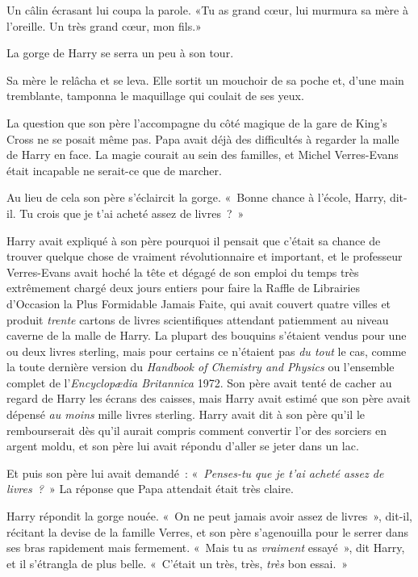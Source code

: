 Un câlin écrasant lui coupa la parole. «Tu as grand cœur, lui murmura sa mère à l'oreille. Un très grand cœur, mon fils.»

La gorge de Harry se serra un peu à son tour.

Sa mère le relâcha et se leva. Elle sortit un mouchoir de sa poche et, d'une main tremblante, tamponna le maquillage qui coulait de ses yeux.

La question que son père l'accompagne du côté magique de la gare de King's Cross ne se posait même pas.
Papa avait déjà des difficultés à regarder la malle de Harry en face.
La magie courait au sein des familles, et Michel Verres-Evans était incapable ne serait-ce que de marcher.

Au lieu de cela son père s'éclaircit la gorge.
«~Bonne chance à l'école, Harry, dit-il. Tu crois que je t'ai acheté assez de livres~?~»

Harry avait expliqué à son père pourquoi il pensait que c'était sa chance de trouver quelque chose de vraiment révolutionnaire et important, et le professeur Verres-Evans avait hoché la tête et dégagé de son emploi du temps très extrêmement chargé deux jours entiers pour faire la Raffle de Librairies d'Occasion la Plus Formidable Jamais Faite, qui avait couvert quatre villes et produit \emph{trente} cartons de livres scientifiques attendant patiemment au niveau caverne de la malle de Harry.
La plupart des bouquins s'étaient vendus pour une ou deux livres sterling, mais pour certains ce n'étaient pas \emph{du tout} le cas, comme la toute dernière version du \emph{Handbook of Chemistry and Physics} ou l'ensemble complet de l'\emph{Encyclop\ae dia Britannica} 1972.
Son père avait tenté de cacher au regard de Harry les écrans des caisses,
mais Harry avait estimé que son père avait dépensé \emph{au moins} mille livres sterling.
Harry avait dit à son père qu'il le rembourserait dès qu'il aurait compris comment convertir l'or des sorciers en argent moldu, et son père lui avait répondu d'aller se jeter dans un lac.

Et puis son père lui avait demandé~: «~\emph{Penses-tu que je t'ai acheté assez de livres~?}~» La réponse que Papa attendait était très claire.

Harry répondit la gorge nouée. «~On ne peut jamais avoir assez de livres~», dit-il, récitant la devise de la famille Verres, et son père s'agenouilla pour le serrer dans ses bras rapidement mais fermement. «~Mais tu as \emph{vraiment} essayé~», dit Harry, et il s'étrangla de plus belle. «~C'était un très, très, \emph{très} bon essai.~»

